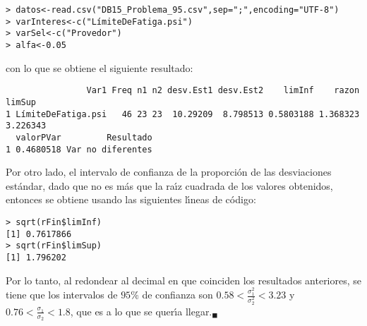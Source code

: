 \begin{solucion}
 \begin{verbatim}
> datos<-read.csv("DB15_Problema_95.csv",sep=";",encoding="UTF-8")
> varInteres<-c("LímiteDeFatiga.psi")
> varSel<-c("Provedor")
> alfa<-0.05
 \end{verbatim}
 \vspace{-0.5cm}
 con lo que se obtiene el siguiente resultado:
 \begin{verbatim}
                Var1 Freq n1 n2 desv.Est1 desv.Est2    limInf    razon   limSup
1 LímiteDeFatiga.psi   46 23 23  10.29209  8.798513 0.5803188 1.368323 3.226343
  valorPVar         Resultado
1 0.4680518 Var no diferentes
 \end{verbatim}
 \vspace{-0.5cm}
 Por otro lado, el intervalo de confianza de la proporci\'on de las desviaciones est\'andar, dado que no es m\'as que la ra\'{\i}z cuadrada de los valores obtenidos, entonces se obtiene usando las siguientes l\'{\i}neas de c\'odigo:
 \begin{verbatim}
> sqrt(rFin$limInf)
[1] 0.7617866
> sqrt(rFin$limSup)
[1] 1.796202
 \end{verbatim}
 \vspace{-0.5cm}
 Por lo tanto, al redondear al decimal en que coinciden los resultados anteriores, se tiene que los intervalos de $95\%$ de confianza son $0.58 < \frac{\sigma_1^2}{\sigma_2^2} < 3.23$ y $0.76 < \frac{\sigma_1}{\sigma_2} < 1.8$, que es a lo que se quer\'{\i}a llegar.${}_{\blacksquare}$
\end{solucion}
